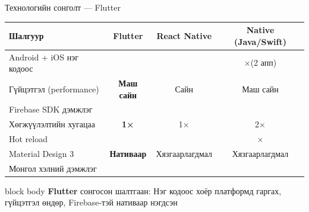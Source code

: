\documentclass[14pt,aspectratio=169]{beamer}
\newcommand{\YES}{\textcolor{okgreen}{\checkmark}}
\newcommand{\NO}{\textcolor{badred}{$\times$}}
\begin{document}
\begin{frame}{Технологийн сонголт — Flutter}
  \begin{center}
  \small
  \renewcommand{\arraystretch}{1.3}
  \begin{tabular}{lccc}
    \toprule
    \rowcolor{navyblue}
    {\color{white}\textbf{Шалгуур}} &
    {\color{white}\textbf{Flutter}} &
    {\color{white}\textbf{React Native}} &
    {\color{white}\textbf{Native (Java/Swift)}} \\
    \midrule
    \rowcolor{rowgray}
    Android + iOS нэг кодоос & \YES & \YES & \NO (2 апп) \\
    Гүйцэтгэл (performance) & \textbf{Маш сайн} & Сайн & Маш сайн \\
    \rowcolor{rowgray}
    Firebase SDK дэмжлэг & \YES & \YES & \YES \\
    Хөгжүүлэлтийн хугацаа & \textbf{1×} & 1× & 2× \\
    \rowcolor{rowgray}
    Hot reload & \YES & \YES & \NO \\
    Material Design 3 & \textbf{Нативаар} & Хязгаарлагдмал & Хязгаарлагдмал \\
    \rowcolor{rowgray}
    Монгол хэлний дэмжлэг & \YES & \YES & \YES \\
    \bottomrule
  \end{tabular}
  \end{center}
  \vspace{4pt}
  \begin{beamercolorbox}[sep=4pt,rounded=true]{block body}
    \small\centering
    \textbf{Flutter} сонгосон шалтгаан: Нэг кодоос хоёр платформд гаргах,
    гүйцэтгэл өндөр, Firebase-тэй нативаар нэгдсэн
  \end{beamercolorbox}
\end{frame}

\end{document}
